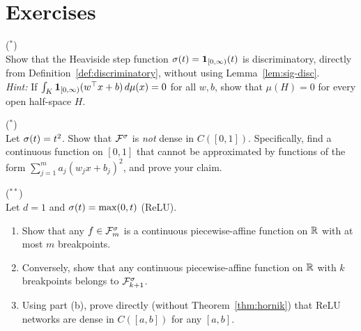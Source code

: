 \documentclass[11pt,a4paper]{article}
\begin{document}
\section{Exercises}
\label{sec:exercises}

\begin{exercise}
\textnormal{(\({}^*\))} \\
Show that the Heaviside step function $\sigma(t) =
\mathbf{1}_{[0,\infty)}(t)$ is discriminatory, directly from
Definition~\ref{def:discriminatory}, without using
Lemma~\ref{lem:sig-disc}. \\
\textit{Hint:} If $\int_K \mathbf{1}_{[0,\infty)}(w^\top x + b) \,
d\mu(x) = 0$ for all $w, b$, show that $\mu(H) = 0$ for every open
half-space $H$.
\end{exercise}

\begin{exercise}
\textnormal{(\({}^*\))} \\
Let $\sigma(t) = t^2$.  Show that $\mathcal{F}^{\sigma}$ is \emph{not}
dense in $C([0,1])$.  Specifically, find a continuous function on $[0,1]$
that cannot be approximated by functions of the form $\sum_{j=1}^m a_j
(w_j x + b_j)^2$, and prove your claim.
\end{exercise}

\begin{exercise}
\textnormal{(\({}^{**}\))} \\
Let $d = 1$ and $\sigma(t) = \max(0, t)$ (ReLU).
\begin{enumerate}[label=(\alph*)]
  \item Show that any $f \in \mathcal{F}_m^{\sigma}$ is a continuous
    piecewise-affine function on $\mathbb{R}$ with at most $m$ breakpoints.
  \item Conversely, show that any continuous piecewise-affine function
    on $\mathbb{R}$ with $k$ breakpoints belongs to $\mathcal{F}_{k+1}^{\sigma}$.
  \item Using part (b), prove directly (without Theorem~\ref{thm:hornik})
    that ReLU networks are dense in $C([a,b])$ for any $[a,b]$.
\end{enumerate}
\end{exercise}
\end{document}
